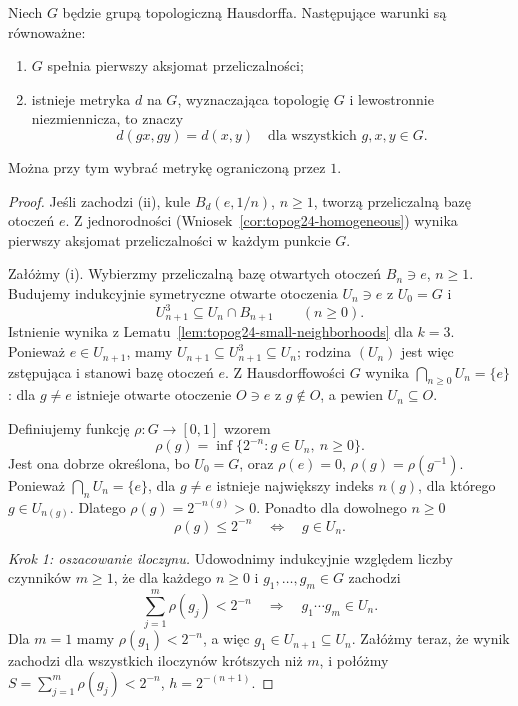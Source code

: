 \begin{twierdzenie}
\label{thm:topog24-birkhoff-kakutani}
Niech \(G\) będzie grupą topologiczną Hausdorffa.
Następujące warunki są równoważne:
\begin{enumerate}[label=\textup{(\roman*)}]
\item \(G\) spełnia pierwszy aksjomat przeliczalności;
\item istnieje metryka \(d\) na \(G\), wyznaczająca
topologię \(G\) i lewostronnie niezmiennicza, to znaczy
\[
 d(gx,gy)=d(x,y)
 \quad\text{dla wszystkich }g,x,y\in G.
\]
\end{enumerate}
Można przy tym wybrać metrykę ograniczoną przez \(1\).
\end{twierdzenie}
\begin{proof}
Jeśli zachodzi \textup{(ii)}, kule
\(B_d(e,1/n)\), \(n\ge1\),
tworzą przeliczalną bazę otoczeń \(e\).
Z jednorodności
(Wniosek~\ref{cor:topog24-homogeneous})
wynika pierwszy aksjomat przeliczalności
w każdym punkcie \(G\).

Załóżmy \textup{(i)}.
Wybierzmy przeliczalną bazę
otwartych otoczeń \(B_n\ni e\), \(n\ge1\).
Budujemy indukcyjnie symetryczne
otwarte otoczenia \(U_n\ni e\)
z \(U_0=G\) i
\[
 U_{n+1}^3\subseteq U_n\cap B_{n+1}
 \qquad(n\ge0).
\]
Istnienie wynika z
Lematu~\ref{lem:topog24-small-neighborhoods}
dla \(k=3\). Ponieważ
\(e\in U_{n+1}\), mamy
\(U_{n+1}\subseteq U_{n+1}^3\subseteq U_n\);
rodzina \((U_n)\) jest więc zstępująca
i stanowi bazę otoczeń \(e\).
Z Hausdorffowości \(G\) wynika
\(\bigcap_{n\ge0}U_n=\{e\}\):
dla \(g\neq e\) istnieje otwarte
otoczenie \(O\ni e\) z \(g\notin O\),
a pewien \(U_n\subseteq O\).

Definiujemy funkcję \(\rho\colon G\to[0,1]\)
wzorem
\[
 \rho(g)=\inf\{2^{-n}:g\in U_n,\ n\ge0\}.
\]
Jest ona dobrze określona,
bo \(U_0=G\), oraz
\(\rho(e)=0\),
\(\rho(g)=\rho(g^{-1})\).
Ponieważ \(\bigcap_nU_n=\{e\}\),
dla \(g\neq e\) istnieje największy
indeks \(n(g)\), dla którego \(g\in U_{n(g)}\).
Dlatego \(\rho(g)=2^{-n(g)}>0\).
Ponadto dla dowolnego \(n\ge0\)
\[
 \rho(g)\le 2^{-n}
 \quad\Longleftrightarrow\quad g\in U_n.
\]

\emph{Krok 1: oszacowanie iloczynu.}
Udowodnimy indukcyjnie względem liczby
czynników \(m\ge1\), że dla każdego \(n\ge0\)
i \(g_1,\ldots,g_m\in G\) zachodzi
\[
 \sum_{j=1}^{m}\rho(g_j)<2^{-n}
 \quad\Longrightarrow\quad
 g_1\cdots g_m\in U_n.
 \tag{*}
\]
Dla \(m=1\) mamy
\(\rho(g_1)<2^{-n}\),
a więc \(g_1\in U_{n+1}\subseteq U_n\).
Załóżmy teraz, że wynik zachodzi
dla wszystkich iloczynów krótszych
niż \(m\), i połóżmy
\(S=\sum_{j=1}^m\rho(g_j)<2^{-n}\),
\(h=2^{-(n+1)}\).


\end{proof}
